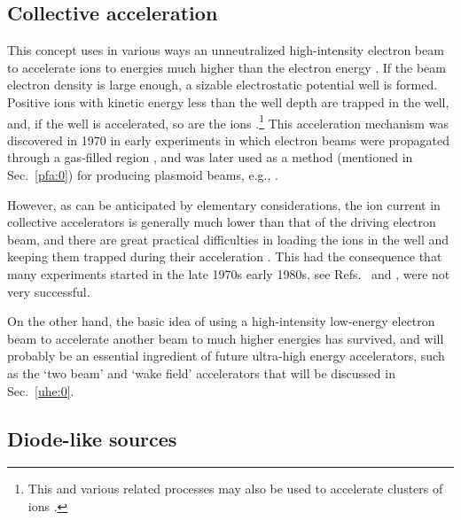 \documentclass [12pt,a4paper,     ]{report} %
\begin{document}
\subsection{Collective acceleration}

This concept uses in various ways an unneutralized high-intensity electron beam to accelerate ions to energies much higher than the electron energy \cite{OLSON1979-}. If the beam electron density is large enough, a sizable electrostatic potential well is formed.  Positive ions with kinetic energy less than the well depth are trapped in the well, and, if the well is accelerated, so are the ions \cite{GOLDE1981-}.\footnote{This and various related processes may also be used to accelerate clusters of ions \cite{DOGGE1969-}.}  This acceleration mechanism was discovered in 1970 in early experiments in which electron beams were propagated through a gas-filled region \cite{RANDE1970-}, and was later used as a method (mentioned in Sec.~\ref{pfa:0}) for producing plasmoid beams, e.g., \cite{DESTL1988-}.

   However, as can be anticipated by elementary considerations, the ion current in collective accelerators is generally much lower than that of the driving electron beam, and there are great practical difficulties in loading the ions in the well and keeping them trapped during their acceleration \cite{GOLDE1981-}.  This had the consequence that many experiments started in the late 1970s early 1980s, see Refs.~\cite[Chap.7]{MILLE1982-} and \cite{KEEFE1981-}, were not very successful.

   On the other hand, the basic idea of using a high-intensity low-energy electron beam to accelerate another beam to much higher energies has survived, and will probably be an essential ingredient of future ultra-high energy accelerators, such as the `two beam' and `wake field' accelerators that will be discussed in Sec.~\ref{uhe:0}.


\subsection{Diode-like sources}
\end{document}
